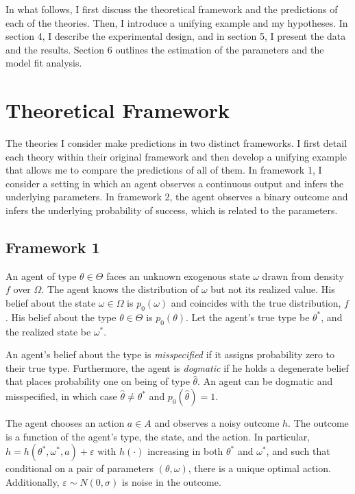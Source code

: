 \documentclass[
  12pt,
]{article}
\begin{document}
In what follows, I first discuss the theoretical framework and the
predictions of each of the theories. Then, I introduce a unifying
example and my hypotheses. In section 4, I describe the experimental
design, and in section 5, I present the data and the results. Section 6
outlines the estimation of the parameters and the model fit analysis.

\hypertarget{theoretical-framework}{%
\section{Theoretical Framework}\label{theoretical-framework}}

The theories I consider make predictions in two distinct frameworks. I
first detail each theory within their original framework and then
develop a unifying example that allows me to compare the predictions of
all of them. In framework 1, I consider a setting in which an agent
observes a continuous output and infers the underlying parameters. In
framework 2, the agent observes a binary outcome and infers the
underlying probability of success, which is related to the parameters.

\hypertarget{framework-1}{%
\subsection{Framework 1}\label{framework-1}}

An agent of type \(\theta \in \Theta\) faces an unknown exogenous state
\(\omega\) drawn from density \(f\) over \(\Omega\). The agent knows the
distribution of \(\omega\) but not its realized value. His belief about
the state \(\omega\in\Omega\) is \(p_0(\omega)\) and coincides with the
true distribution, \(f\). His belief about the type \(\theta\in\Theta\)
is \(p_0(\theta)\). Let the agent's true type be \(\theta^{*}\), and the
realized state be \(\omega^{*}\).

An agent's belief about the type is \emph{misspecified} if it assigns
probability zero to their true type. Furthermore, the agent is
\emph{dogmatic} if he holds a degenerate belief that places probability
one on being of type \(\hat{\theta}\). An agent can be dogmatic and
misspecified, in which case \(\hat{\theta} \neq \theta^*\) and
\(p_0(\hat{\theta}) = 1\).

The agent chooses an action \(a\in A\) and observes a noisy outcome
\(h\). The outcome is a function of the agent's type, the state, and the
action. In particular, \(h = h(\theta^*, \omega^*, a) + \varepsilon\)
with \(h(\cdot)\) increasing in both \(\theta^*\) and \(\omega^*\), and
such that conditional on a pair of parameters \((\theta, \omega)\),
there is a unique optimal action. Additionally,
\(\varepsilon\sim N(0, \sigma)\) is noise in the outcome.
\end{document}
